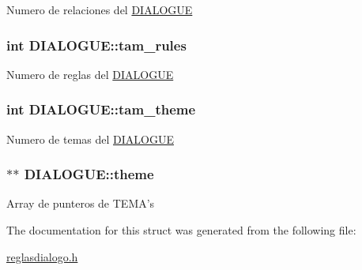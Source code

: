 \label{structDIALOGUE_a3b4b15ee1d429c354646fe23be1441df}
Numero de relaciones del \hyperlink{structDIALOGUE}{DIALOGUE} \hypertarget{structDIALOGUE_a4ea7611ebc3e72b35a4ce8b9a9203ca0}{
\subsubsection[{tam\_\-rules}]{\setlength{\rightskip}{0pt plus 5cm}int {\bf DIALOGUE::tam\_\-rules}}}
\label{structDIALOGUE_a4ea7611ebc3e72b35a4ce8b9a9203ca0}
Numero de reglas del \hyperlink{structDIALOGUE}{DIALOGUE} \hypertarget{structDIALOGUE_a6487cf77205dc52c373bb40659c8f9cd}{
\subsubsection[{tam\_\-theme}]{\setlength{\rightskip}{0pt plus 5cm}int {\bf DIALOGUE::tam\_\-theme}}}
\label{structDIALOGUE_a6487cf77205dc52c373bb40659c8f9cd}
Numero de temas del \hyperlink{structDIALOGUE}{DIALOGUE} \hypertarget{structDIALOGUE_ae0bc7a4bb9cbb877e2b94b394cab6d2f}{
\subsubsection[{theme}]{$\ast$$\ast$ {\bf DIALOGUE::theme}}}
\label{structDIALOGUE_ae0bc7a4bb9cbb877e2b94b394cab6d2f}
Array de punteros de TEMA's 

The documentation for this struct was generated from the following file:\begin{DoxyCompactItemize}
\item 
\hyperlink{reglasdialogo_8h}{reglasdialogo.h}\end{DoxyCompactItemize}
